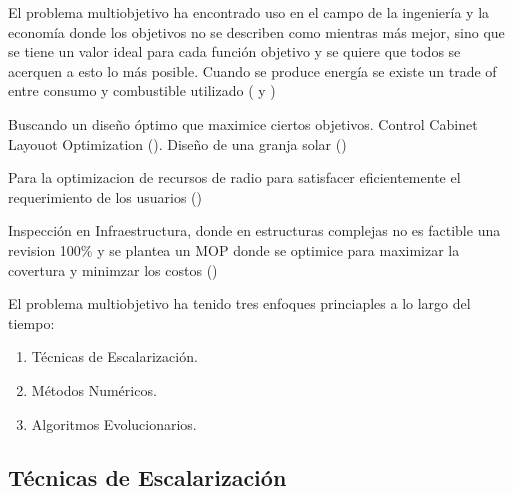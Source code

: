 
El problema multiobjetivo ha encontrado uso en el campo de la ingenier\'ia y la econom\'ia donde los objetivos no se describen como mientras m\'as mejor, sino que se tiene un valor ideal para cada funci\'on objetivo y se quiere que todos se acerquen a esto lo m\'as posible. Cuando se produce energ\'ia se existe un trade of entre consumo  y combustible utilizado (\cite{shirazi2012thermal} y \cite{shirazi2014thermal})

Buscando un diseño \'optimo que maximice ciertos objetivos. Control Cabinet Layouot Optimization (\cite{pllana2019customizing}). Diseño de una granja solar (\cite{ganesan2013hypervolume})

Para la optimizacion de recursos de radio para satisfacer eficientemente el requerimiento de los usuarios (\cite{bjornson2013optimal})

Inspecci\'on en Infraestructura, donde en estructuras complejas no es factible una revision 100\% y se plantea un MOP donde se optimice para maximizar la covertura y minimzar los costos (\cite{ellefsen2017multiobjective})


El problema multiobjetivo ha tenido tres enfoques princiaples a lo largo del tiempo:
\begin{enumerate}
    \item T\'ecnicas de Escalarizaci\'on.
    \item M\'etodos Num\'ericos.
    \item Algoritmos Evolucionarios.
\end{enumerate}



\subsection{T\'ecnicas de Escalarizaci\'on }

